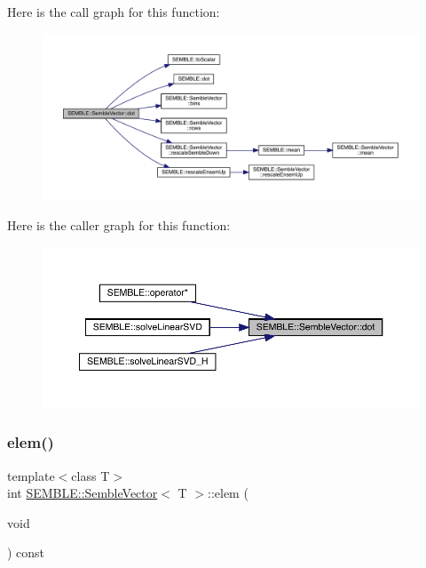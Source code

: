 Here is the call graph for this function\+:
\nopagebreak
\begin{figure}[H]
\begin{center}
\leavevmode
\includegraphics[width=350pt]{d9/d94/structSEMBLE_1_1SembleVector_a32f9480a402dc8d53c69fa1b09c03c82_cgraph}
\end{center}
\end{figure}
Here is the caller graph for this function\+:
\nopagebreak
\begin{figure}[H]
\begin{center}
\leavevmode
\includegraphics[width=350pt]{d9/d94/structSEMBLE_1_1SembleVector_a32f9480a402dc8d53c69fa1b09c03c82_icgraph}
\end{center}
\end{figure}
\mbox{\label{structSEMBLE_1_1SembleVector_a4054d66d607dbedd52f2d11cd9d1086c}} 
\subsubsection{\texorpdfstring{elem()}{elem()}\hspace{0.1cm}{\footnotesize\ttfamily [1/2]}}
{\footnotesize\ttfamily template$<$class T$>$ \\
int \mbox{\hyperlink{structSEMBLE_1_1SembleVector}{S\+E\+M\+B\+L\+E\+::\+Semble\+Vector}}$<$ T $>$\+::elem (\begin{DoxyParamCaption}\item[{void}]{ }\end{DoxyParamCaption}) const\hspace{0.3cm}{\ttfamily [inline]}}

